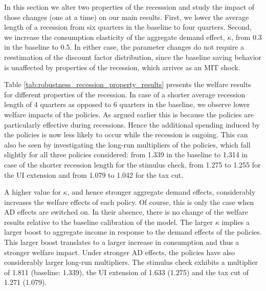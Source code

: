 \documentclass[../HAFiscal]{subfiles}
\begin{document}
In this section we alter two properties of the recesssion and study the impact of those changes (one at a time) on our main results. First, we lower the average length of a recession from six quarters in the baseline to four quarters. Second, we increase the consumption elasticity of the aggregate demand effect, $\kappa$, from 0.3 in the baseline to 0.5. In either case, the parameter changes do not require a reestimation of the discount factor distribution, since the baseline saving behavior is unaffected by properties of the recession, which arrives as an MIT shock. 

Table \ref{tab:robustness_recession_property_results} presents the welfare results for different properties of the recession. In case of a shorter average recession length of 4 quarters as opposed to 6 quarters in the baseline, we observe lower welfare impacts of the policies. As argued earlier this is because the policies are particularly effective during recessions. Hence the additional spending induced by the policies is now less likely to occur while the recession is ongoing. This can also be seen by investigating the long-run multipliers of the policies, which fall slightly for all three policies considered: from 1.339 in the baseline to 1.314 in case of the shorter recession length for the stimulus check, from 1.275 to 1.255 for the UI extension and from 1.079 to 1.042 for the tax cut.

A higher value for $\kappa$, and hence stronger aggregate demand effects, considerably increases the welfare effects of each policy. Of course, this is only the case when AD effects are switched on. In their absence, there is no change of the welfare results relative to the baseline calibration of the model. The larger $\kappa$ implies a larger boost to aggregate income in response to the demand effects of the policies. This larger boost translates to a larger increase in consumption and thus a stronger welfare impact. Under stronger AD effects, the policies have also considerably larger long-run multipliers. The stimulus check exhibits a multiplier of 1.811 (baseline: 1.339), the UI extension of 1.633 (1.275) and the tax cut of 1.271 (1.079).
\end{document}
